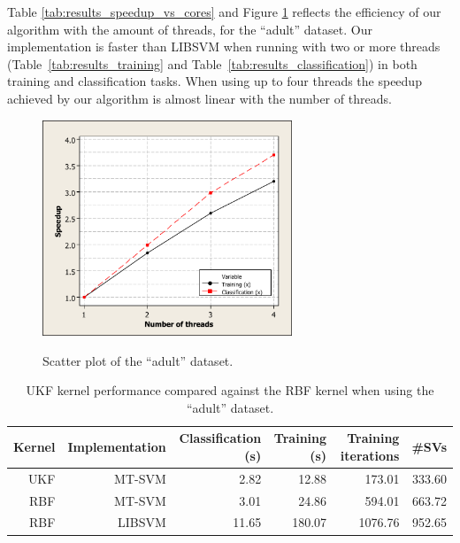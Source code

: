 \documentclass{llncs}
\begin{document}
Table \ref{tab:results_speedup_vs_cores} and Figure \ref{fig:results:cores_vs_speedup} reflects the efficiency of our algorithm with the amount of threads, for the ``adult'' dataset. Our implementation is faster than LIBSVM when running with two or more threads (Table~\ref{tab:results_training} and Table~\ref{tab:results_classification}) in both training and classification tasks. When using up to four threads the speedup achieved by our algorithm is almost linear with the number of threads.

\begin{figure}[!ht]
	\centering
	\caption{Scatter plot of the ``adult'' dataset.}
	\vspace{0.333cm}
	\includegraphics[width=0.666\textwidth]{pictures/mysvm_mt_cores_vs_speedup.pdf}
	\label{fig:results:cores_vs_speedup}
\end{figure}

\begin{table}[!ht]
  \centering
  \caption{UKF kernel performance compared against the RBF kernel when using the ``adult'' dataset.}
    \begin{tabular}{|r|r|r|r|r|r|} \hline
    Kernel & Implementation & Classification (s) & Training (s) & Training iterations & \#SVs \\ \hline
    UKF   & MT-SVM & 2.82  & 12.88 & 173.01 & 333.60 \\ \hline
    RBF   & MT-SVM & 3.01  & 24.86 & 594.01 & 663.72 \\ \hline
    RBF   & LIBSVM & 11.65 & 180.07 & 1076.76 & 952.65 \\ \hline
    \end{tabular}%
  \label{tab:ukf_vs_rbf}%
\end{table}%
\end{document}

